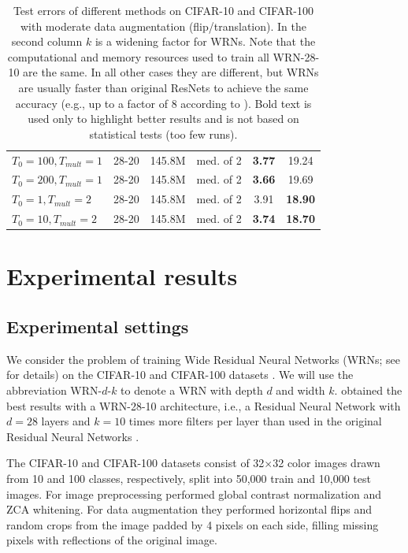 \documentclass{article}
\begin{document}
\begin{table}[t]
\begin{center}
\begin{tabular}{ l | c | c | c | c | c }
		$T_0=100, T_{mult}=1$	& 28-20 &  145.8M & med. of 2			& \textbf{3.77} & 19.24 \\
		$T_0=200, T_{mult}=1$	& 28-20 &  145.8M & med. of 2 		& \textbf{3.66} & 19.69 \\
		$T_0=1, T_{mult}=2$		& 28-20 &  145.8M & med. of 2		& 3.91 & \textbf{18.90} \\
		$T_0=10, T_{mult}=2$	& 28-20 &  145.8M & med. of 2			& \textbf{3.74} & \textbf{18.70} \\
    \hline
  \end{tabular}
\end{center}
\caption{Test errors of different methods on CIFAR-10 and CIFAR-100 with moderate data
augmentation (flip/translation). In the second column $k$ is a widening factor for WRNs.  Note that the computational and memory resources used to train all WRN-28-10 are the same. In all other cases they are different, but WRNs are usually faster than original  ResNets to achieve the same accuracy (e.g., up to a factor of 8 according to \cite{zagoruyko2016wide}). Bold text is used only to highlight better results and is not based on statistical tests (too few runs).}
\end{table}

\section{Experimental results}

\subsection{Experimental settings}

We consider the problem of training Wide Residual Neural Networks (WRNs; see \cite{zagoruyko2016wide} for details) 
 on the CIFAR-10 and CIFAR-100 datasets \citep{krizhevsky2009learning}. 
We will use the abbreviation WRN-$d$-$k$ 
to denote a WRN with depth $d$ and width $k$. 
\cite{zagoruyko2016wide} obtained the best results with a WRN-28-10 architecture, 
i.e., a Residual Neural Network with $d=28$ layers and $k=10$ times more filters 
per layer than used in the original Residual Neural Networks \citep{he2015deep,he2016identity}. 

The CIFAR-10 and CIFAR-100 datasets \citep{krizhevsky2009learning} consist of 32$\times$32 color images drawn from 10 and 100 classes, respectively, split into 50,000 train and 10,000 test images. 
For image preprocessing \cite{zagoruyko2016wide} performed 
global contrast normalization and ZCA whitening. For data augmentation they performed horizontal
flips and random crops from the image padded by 4 pixels on each side, filling missing
pixels with reflections of the original image. 
\end{document}
